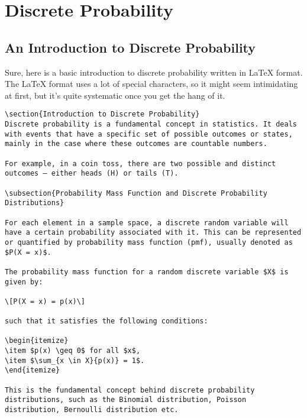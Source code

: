 \section{Discrete Probability}
\subsection{An Introduction to Discrete Probability}
Sure, here is a basic introduction to discrete probability written in LaTeX format. The LaTeX format uses a lot of special characters, so it might seem intimidating at first, but it's quite systematic once you get the hang of it.

\begin{verbatim}
\section{Introduction to Discrete Probability}
Discrete probability is a fundamental concept in statistics. It deals with events that have a specific set of possible outcomes or states, mainly in the case where these outcomes are countable numbers.

For example, in a coin toss, there are two possible and distinct outcomes — either heads (H) or tails (T).

\subsection{Probability Mass Function and Discrete Probability Distributions}

For each element in a sample space, a discrete random variable will have a certain probability associated with it. This can be represented or quantified by probability mass function (pmf), usually denoted as $P(X = x)$.

The probability mass function for a random discrete variable $X$ is given by:

\[P(X = x) = p(x)\]

such that it satisfies the following conditions:

\begin{itemize}
\item $p(x) \geq 0$ for all $x$,
\item $\sum_{x \in X}{p(x)} = 1$.
\end{itemize}

This is the fundamental concept behind discrete probability distributions, such as the Binomial distribution, Poisson distribution, Bernoulli distribution etc.


\end{verbatim}
